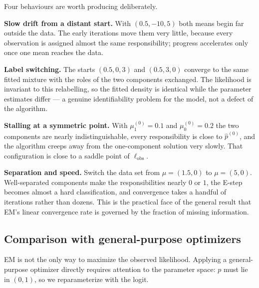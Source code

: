 \documentclass[
  letterpaper,
  DIV=11,
  numbers=noendperiod]{scrreprt}
\begin{document}
Four behaviours are worth producing deliberately.

\textbf{Slow drift from a distant start.} With \((0.5, -10, 5)\) both
means begin far outside the data. The early iterations move them very
little, because every observation is assigned almost the same
responsibility; progress accelerates only once one mean reaches the
data.

\textbf{Label switching.} The starts \((0.5, 0, 3)\) and \((0.5, 3, 0)\)
converge to the same fitted mixture with the roles of the two components
exchanged. The likelihood is invariant to this relabelling, so the
fitted density is identical while the parameter estimates differ --- a
genuine identifiability problem for the model, not a defect of the
algorithm.

\textbf{Stalling at a symmetric point.} With \(\mu_1^{(0)} = 0.1\) and
\(\mu_0^{(0)} = 0.2\) the two components are nearly indistinguishable,
every responsibility is close to \(\hat p^{(0)}\), and the algorithm
creeps away from the one-component solution very slowly. That
configuration is close to a saddle point of \(\ell_{\text{obs}}\).

\textbf{Separation and speed.} Switch the data set from
\(\mu = (1.5, 0)\) to \(\mu = (5, 0)\). Well-separated components make
the responsibilities nearly \(0\) or \(1\), the E-step becomes almost a
hard classification, and convergence takes a handful of iterations
rather than dozens. This is the practical face of the general result
that EM's linear convergence rate is governed by the fraction of missing
information.

\subsection{Comparison with general-purpose
optimizers}\label{comparison-with-general-purpose-optimizers}

EM is not the only way to maximize the observed likelihood. Applying a
general-purpose optimizer directly requires attention to the parameter
space: \(p\) must lie in \((0,1)\), so we reparameterize with the logit.
\end{document}
